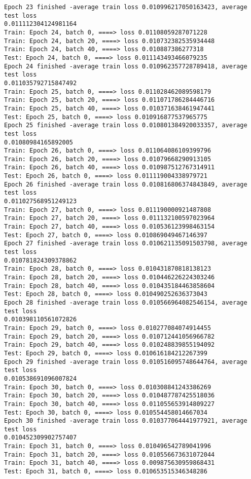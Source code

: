 \documentclass[11pt]{article}
\begin{document}
\begin{Verbatim}[commandchars=\\\{\}]
Epoch 23 finished -average train loss 0.010996217050163423, average test loss
0.011112304124981164
Train: Epoch 24, batch 0, ====> loss 0.01108059287071228
Train: Epoch 24, batch 20, ====> loss 0.010732382535934448
Train: Epoch 24, batch 40, ====> loss 0.010887386277318
Test: Epoch 24, batch 0, ====> loss 0.011143493466079235
Epoch 24 finished -average train loss 0.010962357728789418, average test loss
0.011035792715847492
Train: Epoch 25, batch 0, ====> loss 0.011028462089598179
Train: Epoch 25, batch 20, ====> loss 0.011071786284446716
Train: Epoch 25, batch 40, ====> loss 0.010371638461947441
Test: Epoch 25, batch 0, ====> loss 0.010916877537965775
Epoch 25 finished -average train loss 0.010801384920033357, average test loss
0.01080984165892005
Train: Epoch 26, batch 0, ====> loss 0.011064086109399796
Train: Epoch 26, batch 20, ====> loss 0.01079668290913105
Train: Epoch 26, batch 40, ====> loss 0.010987512767314911
Test: Epoch 26, batch 0, ====> loss 0.011119004338979721
Epoch 26 finished -average train loss 0.010816806374843849, average test loss
0.011027568951249123
Train: Epoch 27, batch 0, ====> loss 0.011190000921487808
Train: Epoch 27, batch 20, ====> loss 0.011132100597023964
Train: Epoch 27, batch 40, ====> loss 0.010536123998463154
Test: Epoch 27, batch 0, ====> loss 0.010869049467146397
Epoch 27 finished -average train loss 0.010621135091503798, average test loss
0.010781824309378862
Train: Epoch 28, batch 0, ====> loss 0.010431870818138123
Train: Epoch 28, batch 20, ====> loss 0.010446226224303246
Train: Epoch 28, batch 40, ====> loss 0.010435184463858604
Test: Epoch 28, batch 0, ====> loss 0.010490252636373043
Epoch 28 finished -average train loss 0.010566964082546154, average test loss
0.010398110561072826
Train: Epoch 29, batch 0, ====> loss 0.010277084074914455
Train: Epoch 29, batch 20, ====> loss 0.010712441056966782
Train: Epoch 29, batch 40, ====> loss 0.010248839855194092
Test: Epoch 29, batch 0, ====> loss 0.010616184212267399
Epoch 29 finished -average train loss 0.010516095748644764, average test loss
0.010538691096007824
Train: Epoch 30, batch 0, ====> loss 0.010308841243386269
Train: Epoch 30, batch 20, ====> loss 0.010487787425518036
Train: Epoch 30, batch 40, ====> loss 0.011055653914809227
Test: Epoch 30, batch 0, ====> loss 0.010554458014667034
Epoch 30 finished -average train loss 0.010377064441977921, average test loss
0.010452309902757407
Train: Epoch 31, batch 0, ====> loss 0.010496542789041996
Train: Epoch 31, batch 20, ====> loss 0.010556673631072044
Train: Epoch 31, batch 40, ====> loss 0.009875630959868431
Test: Epoch 31, batch 0, ====> loss 0.010653515346348286

\end{Verbatim}
\end{document}
